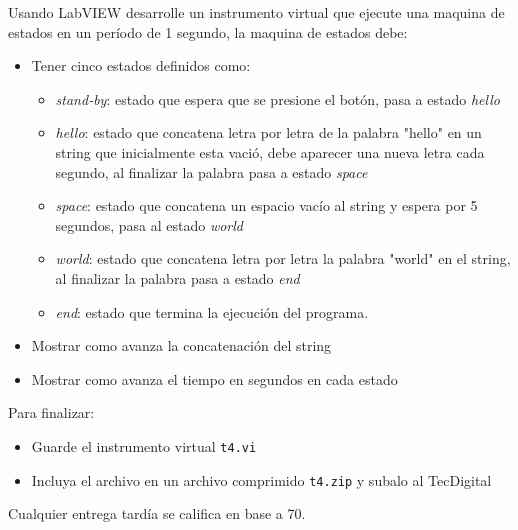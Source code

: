 \documentclass[12pt]{article}
\begin{document}
\setlength{\parindent}{0em}

Usando LabVIEW desarrolle un instrumento virtual que ejecute una maquina de estados en un período de 1 segundo, la maquina de estados debe:

\begin{itemize}
    \item Tener cinco estados definidos como:
        \begin{itemize}
            \item \emph{stand-by}: estado que espera que se presione el botón, pasa a estado \emph{hello}
            \item \emph{hello}: estado que concatena letra por letra de la palabra "hello" en un string que inicialmente esta vació, debe aparecer una nueva letra cada segundo, al finalizar la palabra pasa a estado \emph{space}
            \item \emph{space}: estado que concatena un espacio vacío al string y espera por 5 segundos, pasa al estado \emph{world}
            \item \emph{world}: estado que concatena letra por letra la palabra "world" en el string, al finalizar la palabra pasa a estado \emph{end}
            \item \emph{end}: estado que termina la ejecución del programa.
        \end{itemize}
    \item Mostrar como avanza la concatenación del string
    \item Mostrar como avanza el tiempo en segundos en cada estado
\end{itemize}

Para finalizar: 
\begin{itemize}
    \item Guarde el instrumento virtual \verb+t4.vi+
    \item Incluya el archivo en un archivo comprimido \verb+t4.zip+ y subalo al TecDigital
\end{itemize}

Cualquier entrega tardía se califica en base a 70. 


% 
% 
\end{document}
